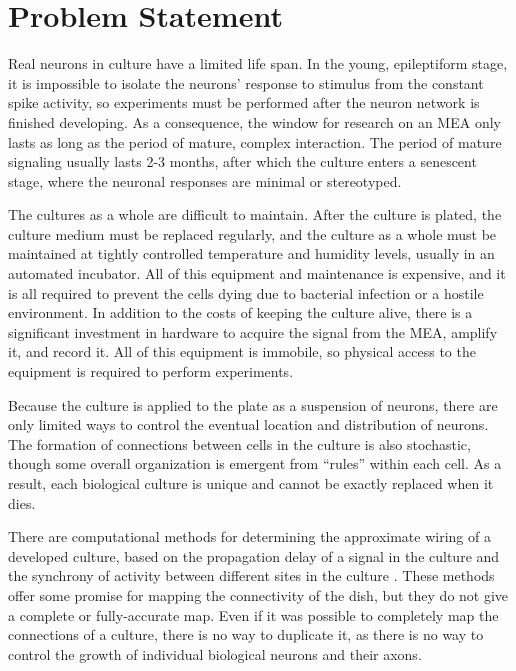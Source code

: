 \documentclass[letterpaper]{article}
\begin{document}
\section{Problem Statement}

Real neurons in culture have a limited life span. 
In the young, epileptiform stage, it is impossible to isolate the neurons' response to stimulus from the constant spike activity, so experiments must be performed after the neuron network is finished developing. 
As a consequence, the window for research on an MEA only lasts as long as the period of mature, complex interaction. 
The period of mature signaling usually lasts 2-3 months, after which the culture enters a senescent stage, where the neuronal responses are minimal or stereotyped. 

The cultures as a whole are difficult to maintain. 
After the culture is plated, the culture medium must be replaced regularly, and the culture as a whole must be maintained at tightly controlled temperature and humidity levels, usually in an automated incubator. 
All of this equipment and maintenance is expensive, and it is all required to prevent the cells dying due to bacterial infection or a hostile environment. 
In addition to the costs of keeping the culture alive, there is a significant investment in hardware to acquire the signal from the MEA, amplify it, and record it. 
All of this equipment is immobile, so physical access to the equipment is required to perform experiments. 

Because the culture is applied to the plate as a suspension of neurons, there are only limited ways to control the eventual location and distribution of neurons. 
The formation of connections between cells in the culture is also stochastic, though some overall organization is emergent from ``rules'' within each cell. 
As a result, each biological culture is unique and cannot be exactly replaced when it dies. 

There are computational methods for determining the approximate wiring of a developed culture, based on the propagation delay of a signal in the culture and the synchrony of activity between different sites in the culture  \cite{erickson2008caged,esposti2008estimation}. 
These methods offer some promise for mapping the connectivity of the dish, but they do not give a complete or fully-accurate map. 
Even if it was possible to completely map the connections of a culture, there is no way to duplicate it, as there is no way to control the growth of individual biological neurons and their axons. 
\end{document}
